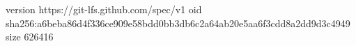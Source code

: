 version https://git-lfs.github.com/spec/v1
oid sha256:a6beba86d4f336ce909e58bdd0bb3db6c2a64ab20e5aa6f3cdd8a2dd9d3c4949
size 626416
